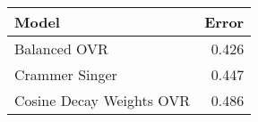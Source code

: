 \begin{tabular}{lr}
\toprule
                           Model &  Error \\
\midrule
                    Balanced OVR &  0.426 \\
                  Crammer Singer &  0.447 \\
        Cosine Decay Weights OVR &  0.486 \\
\bottomrule
\end{tabular}
